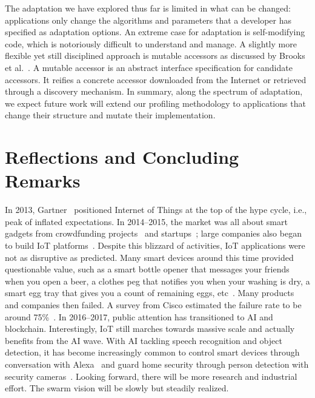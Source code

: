 \documentclass[thesis.tex]{subfiles}
\begin{document}
 The adaptation we have explored thus far is
limited in what can be changed: applications only change the algorithms and
parameters that a developer has specified as adaptation options. An extreme case
for adaptation is self-modifying code, which is notoriously difficult to
understand and manage. A slightly more flexible yet still disciplined approach
is mutable accessors as discussed by Brooks et al.~\cite{brooks2018component}. A
mutable accessor is an abstract interface specification for candidate
accessors. It reifies a concrete accessor downloaded from the Internet or
retrieved through a discovery mechanism. In summary, along the spectrum of
adaptation, we expect future work will extend our profiling methodology to
applications that change their structure and mutate their implementation.

\section{Reflections and Concluding Remarks}
\label{sec:conclusions}

In 2013, Gartner~\cite{middleton2013forecast} positioned Internet of Things at
the top of the hype cycle, i.e., peak of inflated expectations. In 2014--2015,
the market was all about smart gadgets from crowdfunding
projects~\cite{kickstarter} and startups~\cite{fitbit}; large companies also
began to build IoT platforms~\cite{sami, awsiot}. Despite this blizzard of
activities, IoT applications were not as disruptive as predicted. Many smart
devices around this time provided questionable value, such as a smart bottle
opener that messages your friends when you open a beer, a clothes peg that
notifies you when your washing is dry, a smart egg tray that gives you a count
of remaining eggs, etc~\cite{hartmann2016societal}. Many products and companies
then failed. A survey from Cisco estimated the failure rate to be around
75\%~\cite{cisco2017journey}. In 2016--2017, public attention has transitioned
to AI and blockchain. Interestingly, IoT still marches towards massive scale and
actually benefits from the AI wave. With AI tackling speech recognition and
object detection, it has become increasingly common to control smart devices
through conversation with Alexa~\cite{alexa} and guard home security through
person detection with security cameras~\cite{dropcam}. Looking forward, there
will be more research and industrial effort. The swarm vision will be slowly but
steadily realized.
\end{document}
